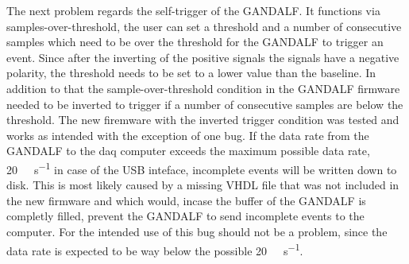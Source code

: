The next problem regards the self-trigger of the GANDALF.
It functions via samples-over-threshold, the user can set a threshold and a number of consecutive samples which need to be over the threshold for the GANDALF to trigger an event.
Since after the inverting of the positive signals the signals have a negative polarity, the threshold needs to be set to a lower \si{\adcu} value than the baseline.
In addition to that the sample-over-threshold condition in the GANDALF firmware needed to be inverted to trigger if a number of consecutive samples are below the threshold.
The new firemware with the inverted trigger condition was tested and works as intended with the exception of one bug.
If the data rate from the GANDALF to the \ac{daq} computer exceeds the maximum possible data rate, \SI{20}{\mega\byte\per\second} in case of the USB inteface, incomplete events will be written down to disk.
This is most likely caused by a missing VHDL file that was not included in the new firmware and which would, incase the buffer of the GANDALF is completly filled, prevent the GANDALF to send incomplete events to the computer.
For the intended use of this bug should not be a problem, since the data rate is expected to be way below the possible \SI{20}{\mega\byte\per\second}.
